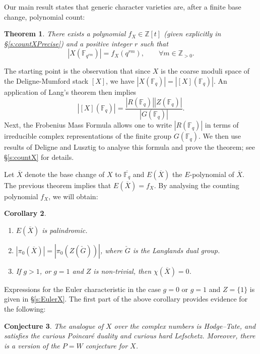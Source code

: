 \documentclass[12pt]{amsart}
\theoremstyle{plain}
\newtheorem{thm}{Theorem}
\newtheorem{conj}[thm]{Conjecture}
\newtheorem{cor}[thm]{Corollary}
\theoremstyle{definition}
\theoremstyle{remark}
\newcommand{\bX}{{X}}
\newcommand{\bR}{R}
\newcommand{\Fq}{\mathbb{F}_q}
\begin{document}
Our main result states that generic character varieties are, after a finite base change, polynomial count:  
 

\begin{thm} \label{t:countX}  There exists a polynomial $f_X \in \mathbb{Z}[t]$ (given explicitly in \S \ref{s:countXPrecise}) and a positive integer $r$ such that 
\[
|X(\mathbb{F}_{q^{rm}})| = f_X(q^{rm}),\qquad \forall m\in \mathbb{Z}_{>0}. 
\] 
\end{thm} 
The starting point is the observation that since $X$ is the coarse moduli space of the Deligne-Mumford stack $[X]$, we have $|X(\Fq)|=|[X](\Fq)|$. An application of Lang's theorem then implies 
\[
\displaystyle |[X](\Fq)|=\frac{|R(\Fq)||Z(\Fq)|}{|G(\Fq)|}.
\] 
Next, the Frobenius Mass Formula allows one to write $|\bR(\Fq)|$ in terms of  irreducible complex representations of the finite group $G(\Fq)$. We then use results of Deligne and Lusztig \cite{DL76} to analyse this formula and prove the theorem; see \S \ref{s:countX} for details. 

Let $\overline{X}$ denote the base change of $X$ to $\overline{\mathbb{F}_q}$ and $E(\overline{X})$ the $E$-polynomial of $\overline{X}$. The previous theorem implies that $E(\overline{X})=f_X$. By analysing the counting polynomial $f_X$, we will obtain:

\begin{cor} \label{c:X}
\begin{enumerate} 
\item[(a)] $E(\overline{X})$ is palindromic.  
\item[(b)] $|\pi_0(\overline{X})|=|\pi_0(Z(\check{G}))|$, where $\check{G}$ is the Langlands dual group. 
\item[(c)] If $g>1$, or $g=1$ and $Z$ is non-trivial, then $\chi(\overline{X})=0$. 
\end{enumerate}  
\end{cor}  

Expressions for the Euler characteristic in the case $g=0$ or $g=1$ and $Z=\{1\}$ is given in \S \ref{s:EulerX}. 
The first part of the above corollary provides evidence for the following: 



\begin{conj} The analogue of  $\bX$ over the complex numbers is Hodge--Tate, and satisfies the curious Poincar\'{e} duality and curious  hard Lefschetz. Moreover, there is a version of the $P=W$ conjecture for $\bX$. 
\end{conj} 
\end{document}
